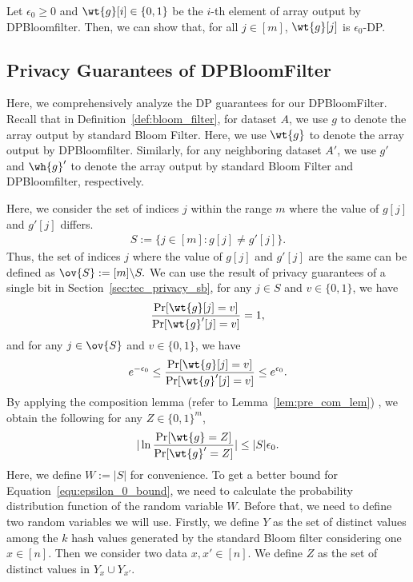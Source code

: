 \begin{lemma}  \label{lem:eps0_DP:informal}
Let $\epsilon_0 \geq 0$ and $\wt{g}[i] \in \{0,1\}$ be the $i$-th element of array output by DPBloomfilter. 
Then, we can show that, for all
$j \in [m]$, $\wt{g}[j]$ is $\epsilon_0$-DP. 
\end{lemma}



\subsection{Privacy Guarantees of DPBloomFilter}\label{sec:tec_privacy_dp}
Here, we comprehensively analyze the DP guarantees for our DPBloomFilter. Recall that in Definition~\ref{def:bloom_filter}, for dataset $A$, we use $g$ to denote the array output by standard Bloom Filter. Here, we use $\wt{g}$ to denote the array output by DPBloomfilter. Similarly, for any neighboring dataset $A'$, we use $g'$ and $\wh{g}'$ to denote the array output by standard Bloom Filter and DPBloomfilter, respectively.

Here, we consider the set of indices $j$ within the range $m$ where the value of $g[j]$ and $g'[j]$ differs.
\begin{align*}
    S := \{j \in [m] : g[j] \neq g'[j]\}.
\end{align*}
Thus, the set of indices $j$ where the value of $g[j]$ and $g'[j]$ are the same can be defined as
$
    \ov{S} := [m] \backslash S.
$
We can use the result of privacy guarantees of a single bit in Section~\ref{sec:tec_privacy_sb}, for any $j \in S$ and $v \in \{0,1\}$, we have
\begin{align*}
\frac{\Pr[\wt{g}[j]=v]}{\Pr[\wt{g}'[j]=v]}  = 1,
\end{align*}
and for any $j \in \ov{S}$ and $v \in \{0,1\}$, we have
\begin{align*}
e^{-\epsilon_{0}} \leq \frac{\Pr[\wt{g}[j]=v]}{\Pr[\wt{g}'[j]=v]} \leq e^{\epsilon_{0}}.
\end{align*}
By applying the composition lemma (refer to Lemma~\ref{lem:pre_com_lem}) , we obtain the following for any $Z \in \{0,1\}^m$,
\begin{align}\label{equ:epsilon_0_bound}
|\ln{\frac{\Pr[\wt{g} = Z]}{\Pr[\wt{g}' = Z]}}| \leq  |S|\epsilon_0.
\end{align}
Here, we define $W := |S|$ for convenience. To get a better bound for Equation~\ref{equ:epsilon_0_bound}, we need to calculate the probability distribution function of the random variable $W$. Before that, we need to define two random variables we will use. Firstly, we define $Y$ as the set of distinct values among the $k$ hash values generated by the standard Bloom filter considering one $x \in [n]$. Then we consider two data $x, x' \in [n]$. We define $Z$ as the set of distinct values in $Y_{x} \cup Y_{x'}$.

